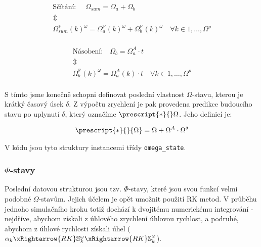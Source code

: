 \begin{equation}
    \label{eq:sim_equations_formalized3}
    \begin{gathered}
        \text{Sčítání: }\quad
        \Omega_{sum} = \Omega_{a} + \Omega_{b} \\
        \Updownarrow \\
        \Omega_{sum}^{\mathbb{P}}(k)^{\omega} = \Omega_{a}^{\mathbb{P}}(k)^{\omega} + \Omega_{b}^{\mathbb{P}}(k)^{\omega}
        \quad \forall k \in {1, \ldots, \Omega^{p}} \\
    \end{gathered}
\end{equation}

\begin{equation}
    \label{eq:sim_equations_formalized4}
    \begin{gathered}
        \text{Násobení:}\quad
        \Omega_{b} = \Omega_{a}^A \cdot t \quad \quad \\
        \Updownarrow \\
        \Omega_{b}^{\mathbb{P}}(k)^{\omega} = \Omega_{a}^{A}(k) \cdot t
        \quad \forall k \in {1, \ldots, \Omega^{p}} \\
    \end{gathered}
\end{equation}

S tímto jsme konečně schopni definovat poslední vlastnost $\Omega$-stavu, kterou je krátký časový úsek $\delta$.
Z výpočtu zrychlení je pak provedena predikce budoucího stavu po uplynutí $\delta$, který označíme $\prescript{*}{}\Omega$.
Jeho definicí je:

\begin{equation}
    \label{eq:sim_equations_formalized5}
    \begin{gathered}
        \prescript{*}{}{\Omega} = \Omega + \Omega^A \cdot \Omega^{\delta}
    \end{gathered}
\end{equation}

V kódu jsou tyto struktury instancemi třídy \texttt{omega\_state}.

\clearpage

\subsubsection{$\Phi$-stavy}

Poslední datovou strukturou jsou tzv. $\Phi$-stavy, které jsou svou funkcí velmi podobné $\Omega$-stavům. Jejich účelem je opět umožnit použití RK metod. V průběhu jednoho simulačního kroku totiž dochází k dvojitému numerickému integrování - nejdříve, abychom získali z úhlového zrychlení úhlovou rychlost, a podruhé, abychom z úhlové rychlosti získali úhel
($\alpha_k \xRightarrow{RK} \mathbb{S}_k^{\omega}  \xRightarrow{RK} \mathbb{S}_k^{\varphi}$).

